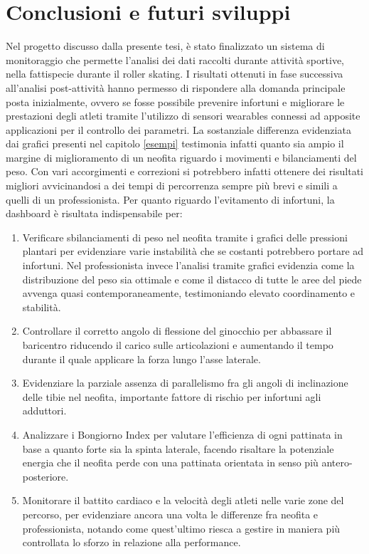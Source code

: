 \documentclass[target=bach,aauheader=,style=]{thud}
\begin{document}
\chapter{Conclusioni e futuri sviluppi}
Nel progetto discusso dalla presente tesi, è stato finalizzato un sistema di monitoraggio che permette l'analisi dei dati raccolti durante attività sportive, nella fattispecie durante il roller skating. I risultati ottenuti in fase successiva all'analisi post-attività hanno permesso di rispondere alla domanda principale posta inizialmente, ovvero se fosse possibile prevenire infortuni e migliorare le prestazioni degli atleti tramite l'utilizzo di sensori wearables connessi ad apposite applicazioni per il controllo dei parametri. La sostanziale differenza evidenziata dai grafici presenti nel capitolo \ref{esempi} testimonia infatti quanto sia ampio il margine di miglioramento di un neofita riguardo i movimenti e bilanciamenti del peso. Con vari accorgimenti e correzioni si potrebbero infatti ottenere dei risultati migliori avvicinandosi a dei tempi di percorrenza sempre più brevi e simili a quelli di un professionista. Per quanto riguardo l'evitamento di infortuni, la dashboard è risultata indispensabile per:
\begin{enumerate}
  \item Verificare sbilanciamenti di peso nel neofita tramite i grafici delle pressioni plantari per evidenziare varie instabilità che se costanti potrebbero portare ad infortuni. Nel professionista invece l'analisi tramite grafici evidenzia come la distribuzione del peso sia ottimale e come il distacco di tutte le aree del piede avvenga quasi contemporaneamente, testimoniando elevato coordinamento e stabilità.
  \item Controllare il corretto angolo di flessione del ginocchio per abbassare il baricentro riducendo il carico sulle articolazioni e aumentando il tempo durante il quale applicare la forza lungo l'asse laterale.
  \item Evidenziare la parziale assenza di parallelismo fra gli angoli di inclinazione delle tibie nel neofita, importante fattore di rischio per infortuni agli adduttori.
  \item Analizzare i Bongiorno Index per valutare l'efficienza di ogni pattinata in base a quanto forte sia la spinta laterale, facendo risaltare la potenziale energia che il neofita perde con una pattinata orientata in senso più antero-posteriore.
  \item Monitorare il battito cardiaco e la velocità degli atleti nelle varie zone del percorso, per evidenziare ancora una volta le differenze fra neofita e professionista, notando come quest'ultimo riesca a gestire in maniera più controllata lo sforzo in relazione alla performance. 
\end{enumerate} 
\end{document}
